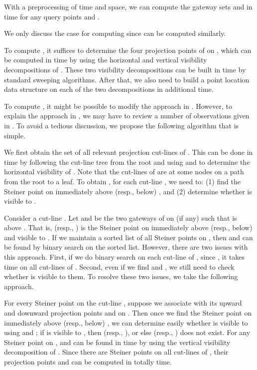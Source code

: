 \documentclass[english,runningheads,11pt]{llncs}
\newenvironment{proof}{\noindent {\textbf{Proof:}}\rm}{\hfill \rm}
\begin{document}
\begin{lemma}\label{lem:30}
With a preprocessing of  time
and  space,
we can compute the gateway sets  and
  in  time for any query points  and .
\end{lemma}
\begin{proof}
We only discuss the case for computing  since  can be
computed similarly.

To compute , it suffices to determine the four
projection points  of  on , which can be computed in
 time by using the horizontal and vertical
visibility decompositions of . These two visibility decompositions can be built in
 time by standard sweeping algorithms.
After that, we also need to build a point location
data structure \cite{ref:EdelsbrunnerOp86,ref:KirkpatrickOp83} on each of the
two decompositions in additional  time.

To compute , it might be possible to modify the approach in
\cite{ref:ChenSh00}. However, to explain the approach in
\cite{ref:ChenSh00}, we may have to review a number of observations given
in \cite{ref:ChenSh00}. To avoid a tedious discussion, we propose
the following algorithm that is simple.


We first obtain the set  of all relevant projection cut-lines of . This can be
done in  time by following the cut-line tree 
from the root and using  and  to determine the horizontal visibility of .
Note that the cut-lines of  are at some
nodes on a path from the root to a leaf. To obtain
, for each cut-line , we need to: (1) find the
Steiner point  on  immediately above (resp., below) , and (2)
determine whether  is visible to .

Consider a cut-line . Let  and  be the two
gateways of  on  (if any) such that  is above
. That is,  (resp., ) is the Steiner
point on  immediately above (resp., below)  and visible to .
If we maintain a sorted list of all Steiner
points on , then  and  can be found by binary
search  on the sorted list. However, there are two issues with this
approach. First, if we do binary search on each cut-line of , since
, it takes  time
on all cut-lines of . Second, even if we find  and
, we still need to check whether  is visible to them. To
resolve these two issues, we take the following approach.



For every Steiner point  on the cut-line , suppose we associate with  its upward and
downward projection points  and  on . Then once we
find the Steiner point  on  immediately above (resp., below) , we can
determine easily whether  is visible to  using  and ; if
 is visible to , then  (resp., ), or else 
(resp., ) does not exist.
For any Steiner point  on ,  and  can be found in  time by using the vertical visibility decomposition of .
Since there are  Steiner points  on all cut-lines of ,
their projection points  and 
can be computed in totally  time.


\end{proof}
\end{document}
